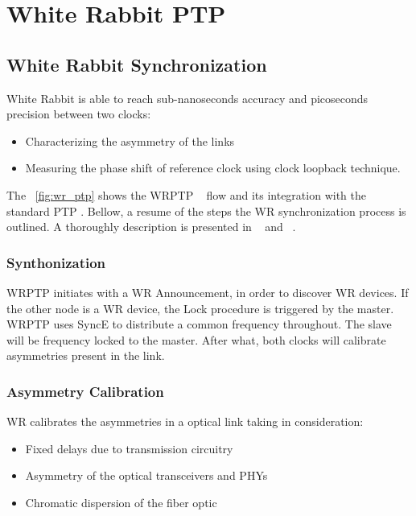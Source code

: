 \section{White Rabbit PTP}
\label{sec:wr}



\subsection{White Rabbit Synchronization}

White Rabbit is able to reach sub-nanoseconds accuracy and picoseconds
precision between two clocks:

\begin{itemize}
    \item Characterizing the asymmetry of the links 
    \item Measuring the phase shift of reference clock using clock loopback technique.
\end{itemize}

The \figurename~\ref{fig:wr_ptp} shows the WRPTP ~\cite{biblio:ispcs_m} flow and
its integration with the standard PTP . Bellow, a resume of the steps the WR synchronization 
process is outlined. A thoroughly description is presented in ~\cite{biblio:tomas} 
and ~\cite{biblio:wrptp}.

\subsubsection{Synthonization}

WRPTP initiates with a WR Announcement, in order to discover WR devices. 
If the other node is a WR device, the Lock procedure is triggered by the master.  
WRPTP uses SyncE to distribute a common frequency throughout. The slave will be 
frequency locked to the master. After what, both clocks will calibrate asymmetries 
present in the link. 

\subsubsection{Asymmetry Calibration}

WR calibrates the asymmetries in a optical link taking in consideration:

\begin{itemize}
    \item Fixed delays due to transmission circuitry
    \item Asymmetry of the optical transceivers and PHYs 
    \item Chromatic dispersion of the fiber optic    
\end{itemize}

